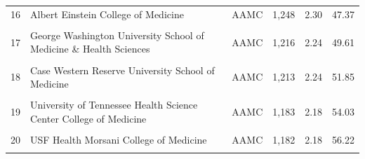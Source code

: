 \begin{tabular}{r p{} l r r r}
16 & Albert Einstein College of Medicine & AAMC & 1,248 & 2.30 & 47.37 \\\\
17 & George Washington University School of Medicine \& Health Sciences & AAMC & 1,216 & 2.24 & 49.61 \\\\
18 & Case Western Reserve University School of Medicine & AAMC & 1,213 & 2.24 & 51.85 \\\\
19 & University of Tennessee Health Science Center College of Medicine & AAMC & 1,183 & 2.18 & 54.03 \\\\
20 & USF Health Morsani College of Medicine & AAMC & 1,182 & 2.18 & 56.22 \\\\
\bottomrule
\end{tabular}
